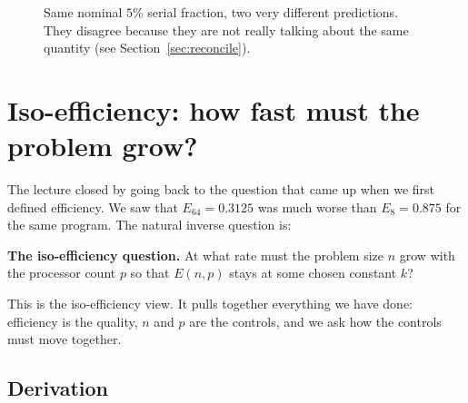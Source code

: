 \begin{figure}[h]
\centering
{}
\caption{Same nominal $5\%$ serial fraction, two very different
predictions. They disagree because they are not really talking about the
same quantity (see Section~\ref{sec:reconcile}).}
\label{fig:amdahl-vs-gustafson}
\end{figure}

\section{Iso-efficiency: how fast must the problem grow?}
\label{sec:isoefficiency}

The lecture closed by going back to the question that came up when we
first defined efficiency. We saw that $E_{64} = 0.3125$ was much worse
than $E_8 = 0.875$ for the same program. The natural inverse question is:

\begin{ppkey}
\textbf{The iso-efficiency question.}
At what rate must the problem size $n$ grow with the processor count $p$
so that $E(n, p)$ stays at some chosen constant $k$?
\end{ppkey}

This is the iso-efficiency view. It pulls together everything we have
done: efficiency is the quality, $n$ and $p$ are the controls, and we ask
how the controls must move together.

\subsection{Derivation}

